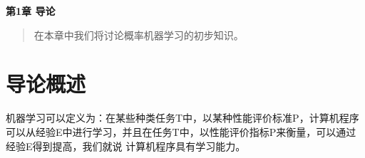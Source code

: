 \newpage
\maketitle
\begin{center}
\Large \textbf{第1章 导论} \quad 
\end{center}
\begin{abstract}
在本章中我们将讨论概率机器学习的初步知识。
\end{abstract}
\section{导论概述}
机器学习可以定义为：在某些种类任务T中，以某种性能评价标准P，计算机程序可以从经验E中进行学习，并且在任务T中，以性能评价指标P来衡量，可以通过经验E得到提高，我们就说
计算机程序具有学习能力。